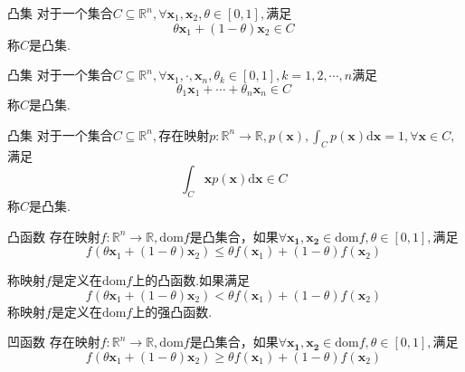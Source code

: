 
\begin{definition}{凸集}
对于一个集合$C\subseteq\mathbb{R}^n,\forall\boldsymbol{x}_1,\boldsymbol{x}_2,\theta\in[0,1],$满足
\begin{equation}
\theta\boldsymbol{x}_1+(1-\theta)\boldsymbol{x}_2\in C~
\end{equation}
称$C$是凸集.
\end{definition}
\begin{definition}{凸集}
对于一个集合$C\subseteq\mathbb{R}^n,\forall\boldsymbol{x}_1,\cdot,\boldsymbol{x}_n,\theta_k\in[0,1],k=1,2,\cdots,n$满足
\begin{equation}
\theta_1\boldsymbol{x}_1+\cdots+\theta_n\boldsymbol{x}_n\in C~
\end{equation}
称$C$是凸集.
\end{definition}
\begin{definition}{凸集}
对于一个集合$C\subseteq\mathbb{R}^n,$存在映射$p:\mathbb{R}^n\to\mathbb{R},p(\boldsymbol{x}),\int_Cp(\boldsymbol{x})\mathrm{d}\boldsymbol{x}=1,\forall\boldsymbol{x}\in C,$满足
\begin{equation}
\int_C\boldsymbol{x}p(\boldsymbol{x})\mathrm{d}\boldsymbol{x}\in C~
\end{equation}
称$C$是凸集.
\end{definition}
\begin{definition}{凸函数}
存在映射$f:\mathbb{R}^n\to\mathbb{R},\mathrm{dom} f$是凸集合，如果$\forall\boldsymbol{x_1},\boldsymbol{x_2}\in\mathrm{dom} f, \theta\in[0,1],$满足
\begin{equation}
f(\theta\boldsymbol{x}_1+(1-\theta)\boldsymbol{x}_2)\leqslant\theta f(\boldsymbol{x}_1) + (1-\theta)f(\boldsymbol{x}_2)~
\end{equation}
\end{definition}
称映射$f$是定义在$\mathrm{dom} f$上的凸函数.如果满足
\begin{equation}
f(\theta\boldsymbol{x}_1+(1-\theta)\boldsymbol{x}_2)<\theta f(\boldsymbol{x}_1) + (1-\theta)f(\boldsymbol{x}_2)~
\end{equation}
称映射$f$是定义在$\mathrm{dom} f$上的强凸函数.
\begin{definition}{凹函数}
存在映射$f:\mathbb{R}^n\to\mathbb{R},\mathrm{dom} f$是凸集合，如果$\forall\boldsymbol{x_1},\boldsymbol{x_2}\in\mathrm{dom} f, \theta\in[0,1],$满足
\begin{equation}
f(\theta\boldsymbol{x}_1+(1-\theta)\boldsymbol{x}_2)\geqslant\theta f(\boldsymbol{x}_1) + (1-\theta)f(\boldsymbol{x}_2)~
\end{equation}
\end{definition}

